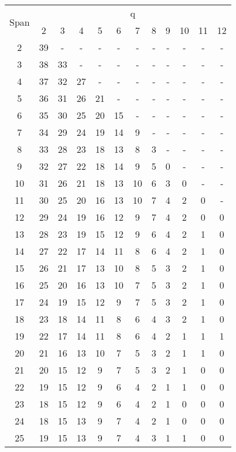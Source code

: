 \documentclass[paper=a4, fontsize=11pt]{scrartcl} %
\numberwithin{equation}{section} %
\numberwithin{figure}{section} %
\numberwithin{table}{section} %
\begin{document}
\begin{table}[H]
\centering
\begin{tabular} {|c|c|c|c|c|c|c|c|c|c|c|c|}
	\hline
	\multirow{ 2}{*}{Span} & \multicolumn{11}{|c|}{q} \\ 
	  & 2 &	3 & 4 &	5 & 6 & 7 & 8 & 9 &	10 & 11 & 12 \\ \hline
	2 & 39 & - & - & - & - & - & - & - & - & - & - \\
	3 & 38 & 33 & - & - & - & - & - & - & - & - & - \\
	4 & 37 & 32 & 27 & - & - & - & - & - & - & - & - \\
	5 & 36 & 31 & 26 & 21 & - & - & - & - & - & - & - \\
	6 & 35 & 30 & 25 & 20 & 15 & - & - & - & - & - & - \\
	7 & 34 & 29 & 24 & 19 & 14 & 9 & - & - & - & - & - \\
	8 & 33 & 28 & 23 & 18 & 13 & 8 & 3 & - & - & - & - \\
	9 & 32 & 27 & 22 & 18 & 14 & 9 & 5 & 0 & - & - & - \\
	10 & 31 & 26 & 21 & 18 & 13 & 10 & 6 & 3 & 0 & - & - \\
	11 & 30 & 25 & 20 & 16 & 13 & 10 & 7 & 4 & 2 & 0 & - \\
	12 & 29 & 24 & 19 & 16 & 12 & 9 & 7 & 4 & 2 & 0 & 0 \\
	13 & 28 & 23 & 19 & 15 & 12 & 9 & 6 & 4 & 2 & 1 & 0 \\
	14 & 27 & 22 & 17 & 14 & 11 & 8 & 6 & 4 & 2 & 1 & 0 \\
	15 & 26 & 21 & 17 & 13 & 10 & 8 & 5 & 3 & 2 & 1 & 0 \\
	16 & 25 & 20 & 16 & 13 & 10 & 7 & 5 & 3 & 2 & 1 & 0 \\
	17 & 24 & 19 & 15 & 12 & 9 & 7 & 5 & 3 & 2 & 1 & 0 \\
	18 & 23 & 18 & 14 & 11 & 8 & 6 & 4 & 3 & 2 & 1 & 0 \\
	19 & 22 & 17 & 14 & 11 & 8 & 6 & 4 & 2 & 1 & 1 & 1 \\
	20 & 21 & 16 & 13 & 10 & 7 & 5 & 3 & 2 & 1 & 1 & 0 \\
	21 & 20 & 15 & 12 & 9 & 7 & 5 & 3 & 2 & 1 & 0 & 0 \\
	22 & 19 & 15 & 12 & 9 & 6 & 4 & 2 & 1 & 1 & 0 & 0 \\
	23 & 18 & 15 & 12 & 9 & 6 & 4 & 2 & 1 & 0 & 0 & 0 \\
	24 & 18 & 15 & 13 & 9 & 7 & 4 & 2 & 1 & 0 & 0 & 0 \\
	25 & 19 & 15 & 13 & 9 & 7 & 4 & 3 & 1 & 1 & 0 & 0 \\

\end{tabular}
\end{table}
\end{document}
